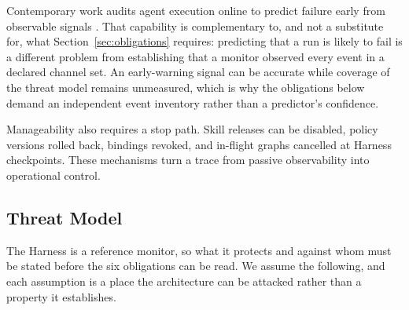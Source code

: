 Contemporary work audits agent execution online to predict failure early from observable signals \cite{zhang2026agentforesight}. That capability is complementary to, and not a substitute for, what Section~\ref{sec:obligations} requires: predicting that a run is likely to fail is a different problem from establishing that a monitor observed every event in a declared channel set. An early-warning signal can be accurate while coverage of the threat model remains unmeasured, which is why the obligations below demand an independent event inventory rather than a predictor's confidence.

Manageability also requires a stop path. Skill releases can be disabled, policy versions rolled back, bindings revoked, and in-flight graphs cancelled at Harness checkpoints. These mechanisms turn a trace from passive observability into operational control.

\subsection{Threat Model}
\label{sec:threat-model}

The Harness is a reference monitor, so what it protects and against whom must be stated before the six obligations can be read. We assume the following, and each assumption is a place the architecture can be attacked rather than a property it establishes.

